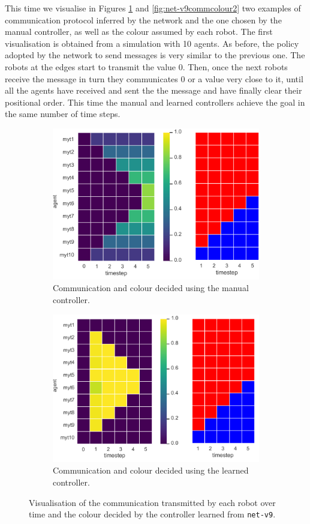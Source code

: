 \medskip
This time we visualise in Figures \ref{fig:net-v9commcolour} and 
\ref{fig:net-v9commcolour2} two examples of communication protocol inferred 
by the network and the one chosen by the manual controller, as well as the colour 
assumed by each robot.
The first visualisation is obtained from a simulation with 10 agents. 
As before, the policy adopted by the network to send messages is very similar to 
the previous one. The robots at the edges start to transmit the value 0. Then, once 
the next robots receive the message in turn they communicates 0 or a value very 
close to it, until all the agents have received and sent the the message and have 
finally clear their positional order.
This time the manual and learned controllers achieve the goal in the same 
number of time steps.
\begin{figure}[!htb]
	\begin{subfigure}[h]{\textwidth}
		\centering
		\includegraphics[width=.55\textwidth]{contents/images/net-v9/net-v9-manual-0}
		\caption{Communication and colour decided using the manual controller.}
	\end{subfigure}
	\hspace*{\fill}%
	\vspace*{8pt}%
	\hspace*{\fill}%
	\begin{subfigure}[h]{\textwidth}
		\centering			
		\includegraphics[width=.55\textwidth]{contents/images/net-v9/net-v9-learned-0}
		\caption{Communication and colour decided using the learned controller.}
	\end{subfigure}
	\caption[Evaluation of the communication learned by 
	\texttt{net-v9}.]{Visualisation of the communication transmitted by each 
		robot over time and the colour decided by the controller learned from 
		\texttt{net-v9}.}	
	\label{fig:net-v9commcolour}
\end{figure}

